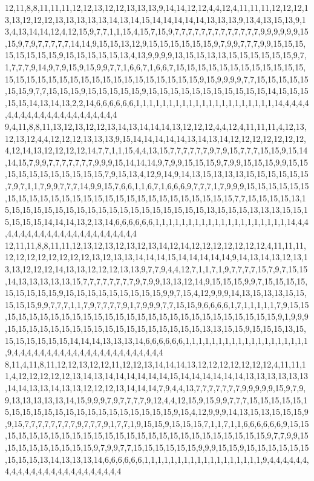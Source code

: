 12,11,8,8,11,11,11,12,12,13,12,12,13,13,13,9,14,14,12,12,4,4,12,4,11,11,11,12,12,12,13,13,12,12,12,13,13,13,13,13,14,13,14,15,14,14,14,14,14,13,13,13,9,13,4,13,15,13,9,13,4,13,14,14,12,4,12,15,9,7,7,1,1,15,4,15,7,15,9,7,7,7,7,7,7,7,7,7,7,7,7,7,9,9,9,9,9,9,15,15,9,7,9,7,7,7,7,7,14,14,9,15,15,13,12,9,15,15,15,15,15,15,9,7,9,9,7,7,7,9,9,15,15,15,15,15,15,15,15,9,15,15,15,15,15,13,4,13,9,9,9,9,13,15,15,13,13,15,15,15,15,15,15,9,7,1,7,7,7,9,14,9,7,9,15,9,15,9,9,7,7,1,6,6,7,1,6,6,7,15,15,15,15,15,15,15,15,15,15,15,15,15,15,15,15,15,15,15,15,15,15,15,15,15,15,15,15,15,15,9,15,9,9,9,9,7,7,15,15,15,15,15,15,15,9,7,7,15,15,15,9,15,15,15,15,15,9,15,15,15,15,15,15,15,15,15,15,15,14,15,15,15,15,15,14,13,14,13,2,2,14,6,6,6,6,6,6,1,1,1,1,1,1,1,1,1,1,1,1,1,1,1,1,1,1,1,1,1,14,4,4,4,4,4,4,4,4,4,4,4,4,4,4,4,4,4,4,4,4,4
9,4,11,8,8,11,13,12,13,12,12,13,14,13,14,14,14,13,12,12,12,4,4,12,4,11,11,11,4,12,13,12,13,12,4,4,12,12,12,13,13,13,9,15,14,14,14,14,14,13,14,13,14,12,12,12,12,12,12,12,4,12,14,13,12,12,12,12,14,7,7,1,1,15,4,4,13,15,7,7,7,7,7,7,9,7,9,15,7,7,7,15,15,9,15,14,14,15,7,9,9,7,7,7,7,7,7,7,9,9,9,15,14,14,14,9,7,9,9,15,15,15,9,7,9,9,15,15,15,9,9,15,15,15,15,15,15,15,15,15,15,15,7,9,15,13,4,12,9,14,9,14,13,15,13,13,13,15,15,15,15,15,15,7,9,7,1,1,7,9,9,7,7,7,14,9,9,15,7,6,6,1,1,6,7,1,6,6,6,9,7,7,7,1,7,9,9,9,15,15,15,15,15,15,15,15,15,15,15,15,15,15,15,15,15,15,15,15,15,15,15,15,15,15,15,7,7,15,15,15,15,13,15,15,15,15,15,15,15,15,15,15,15,15,15,15,15,15,15,15,15,13,15,15,15,13,13,13,15,15,15,15,15,15,14,14,14,13,2,13,14,6,6,6,6,6,6,1,1,1,1,1,1,1,1,1,1,1,1,1,1,1,1,1,1,1,1,14,4,4,4,4,4,4,4,4,4,4,4,4,4,4,4,4,4,4,4,4,4,4
12,11,11,8,8,11,11,12,13,12,13,12,13,12,13,14,12,14,12,12,12,12,12,12,12,4,11,11,11,12,12,12,12,12,12,12,12,13,12,13,13,14,14,14,15,14,14,14,14,14,9,14,13,14,13,12,13,13,13,12,12,12,14,13,13,12,12,12,13,13,9,7,7,9,4,4,12,7,1,1,7,1,9,7,7,7,7,15,7,9,7,15,15,14,13,13,13,13,13,15,7,7,7,7,7,7,7,7,9,7,9,9,13,13,12,14,9,15,15,15,9,9,7,15,15,15,15,15,15,15,15,15,9,15,15,15,15,15,15,15,15,15,9,9,7,15,4,12,9,9,9,14,13,15,13,13,15,15,15,15,15,9,9,7,7,7,1,1,7,9,7,7,7,7,9,1,7,9,9,9,7,7,15,15,9,6,6,6,6,1,7,1,1,1,1,1,7,9,15,15,15,15,15,15,15,15,15,15,15,15,15,15,15,15,15,15,15,15,15,15,15,15,15,15,15,9,1,9,9,9,15,15,15,15,15,15,15,15,15,15,15,15,15,15,15,15,15,15,13,13,15,15,9,15,15,15,13,15,15,15,15,15,15,15,14,14,14,13,13,13,14,6,6,6,6,6,6,1,1,1,1,1,1,1,1,1,1,1,1,1,1,1,1,1,1,1,9,4,4,4,4,4,4,4,4,4,4,4,4,4,4,4,4,4,4,4,4,4,4,4
8,11,4,11,8,11,12,12,13,12,12,11,12,12,13,14,14,14,13,12,12,12,12,12,12,12,4,11,11,11,4,12,12,12,12,12,13,14,13,14,14,14,14,14,14,15,14,14,14,14,14,14,13,13,13,13,13,13,14,14,13,13,14,13,13,12,12,12,13,14,14,14,7,9,4,4,13,7,7,7,7,7,7,7,9,9,9,9,9,15,9,7,9,9,13,13,13,13,13,14,15,9,9,9,7,9,7,7,7,7,9,12,4,4,12,15,9,15,9,9,7,7,7,15,15,15,15,15,15,15,15,15,15,15,15,15,15,15,15,15,15,15,15,15,9,15,4,12,9,9,9,14,13,15,13,15,15,15,9,9,15,7,7,7,7,7,7,7,7,9,7,7,7,9,1,7,7,1,9,15,15,9,15,15,15,7,1,1,7,1,1,6,6,6,6,6,6,9,15,15,15,15,15,15,15,15,15,15,15,15,15,15,15,15,15,15,15,15,15,15,15,15,15,15,9,7,7,9,9,15,15,15,15,15,15,15,15,15,9,7,9,9,7,7,15,15,15,15,15,15,9,9,9,15,15,9,15,15,15,15,15,15,15,15,15,13,14,13,13,13,14,6,6,6,6,6,6,1,1,1,1,1,1,1,1,1,1,1,1,1,1,1,1,1,1,9,4,4,4,4,4,4,4,4,4,4,4,4,4,4,4,4,4,4,4,4,4,4,4,4
